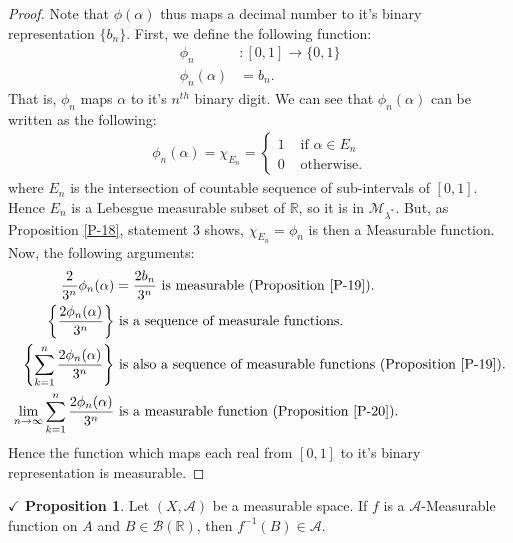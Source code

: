 \documentclass{article}
\theoremstyle{definition}
\theoremstyle{remark}
\theoremstyle{definition}
\theoremstyle{definition}
\newtheorem{proposition}{$\checkmark$ Proposition}
\theoremstyle{definition}
\newcommand{\R}{\mathbb{R}}
\newcommand{\alg}[1]{\mathscr{#1}}
\newcommand{\bor}[1]{\mathscr{B}(#1)}
\newcommand{\set}[1]{\mathscr{#1}}
\newcommand{\msigm}[1]{\set{M}_{#1}}
\newcommand{\inv}[1]{{#1}^{-1}}
\begin{document}
\begin{proof}
	Note that $ \phi(\alpha) $ thus maps a decimal number to it's binary representation $ \{b_n\} $. First, we define the following function:
	\begin{equation*}
		\begin{split}
			\phi_n &: [0,1]\longrightarrow \{0,1\}\\
			\phi_n(\alpha) &= b_n. 
		\end{split}
	\end{equation*}
That is, $ \phi_n $ maps $ \alpha $ to it's $ n^{th} $ binary digit. We can see that $ \phi_n(\alpha) $ can be written as the following:
\begin{equation*}
	\begin{split}
		\phi_n(\alpha) = \chi_{E_n} = \begin{cases}
			1&\text{ if }  \alpha \in E_n \\
			0&\text{ otherwise.}
		\end{cases}
	\end{split}
\end{equation*}
where $ E_n $ is the intersection of countable sequence of sub-intervals of $ [0,1] $. Hence $ E_n $ is a Lebesgue measurable subset of $ \R $, so it is in $ \msigm{\lambda^*} $. But, as Proposition \ref{P-18}, statement 3 shows, $ \chi_{E_n} = \phi_n $ is then a Measurable function.\\
Now, the following arguments:
\begin{equation*}
	\begin{split}
		\frac{2}{3^n} \phi_n(\alpha) &= \frac{2b_n}{3^{n}} \text{ is measurable (Proposition \ref{P-19}).}\\
		\left \{\frac{2\phi_n(\alpha)}{3^n}\right \}&\text{ is a sequence of measurale functions.}\\
		\left \{\sum_{k=1}^{n} \frac{2\phi_n(\alpha)}{3^n}\right \}&\text{ is also a sequence of measurable functions (Proposition \ref{P-19}).}\\
		\lim_{n\to \infty} \sum_{k=1}^{n} \frac{2\phi_n(\alpha)}{3^n}&\text{ is a measurable function (Proposition \ref{P-20}).}
	\end{split}
\end{equation*} 
Hence the function which maps each real from $ [0,1] $ to it's binary representation is measurable.
\end{proof}
\hrulefill
\begin{proposition}
	Let $ (X,\alg{A}) $ be a measurable space. If $ f $ is a $ \alg{A} $-Measurable function on $ A $ and $ B\in \bor{\R} $, then $ \inv{f}(B) \in \alg{A}$.
\end{proposition}
\end{document}
